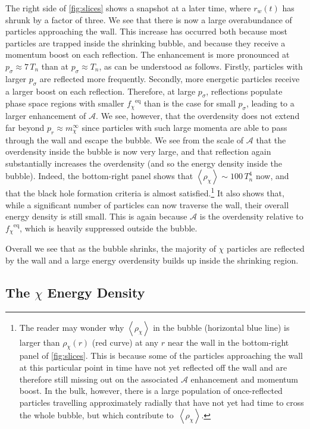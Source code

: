 \documentclass[
onecolumn, %
11pt, %
tightenlines,
superscriptaddress, %
nofootinbib, %
preprintnumbers, %
prd %
]{revtex4-1}
\newcommand{\ev}[1]{\ensuremath{\left\langle #1 %
        \right\rangle}} %
\newcommand{\f}{\ensuremath{f_\chi}\xspace}
\newcommand{\A}{\ensuremath{\mathcal A}\xspace}
\newcommand{\feq}{\ensuremath{\f^\text{eq}}\xspace}
\begin{document}
The right side of \cref{fig:slices} shows a snapshot at a later time, where $r_w(t)$ has shrunk by a factor of three.  We see that there is now a large overabundance of particles approaching the wall.  This increase has occurred both because most particles are trapped inside the shrinking bubble, and because they receive a momentum boost on each reflection. The enhancement is more pronounced at $p_\sigma \approx 7\,T_n$ than at $p_\sigma \approx T_n$, as can be understood as follows.  Firstly, particles with larger $p_\sigma$ are reflected more frequently. Secondly, more energetic particles receive a larger boost on each reflection.  Therefore, at large $p_\sigma$, reflections populate phase space regions with smaller \feq than is the case for small $p_\sigma$, leading to a larger enhancement of $\A$.  We see, however, that the overdensity does not extend far beyond $p_r \approx m_\chi^\infty$ since particles with such large momenta are able to pass through the wall and escape the bubble.  We see from the scale of $\A$ that the overdensity inside the bubble is now very large, and that reflection again substantially increases the overdensity (and so the energy density inside the bubble).  Indeed, the bottom-right panel shows that $\ev{\rho_\chi} \sim 100\,T_n^4$ now, and that the black hole formation criteria is almost satisfied.\footnote{The reader may wonder why $\ev{\rho_\chi}$ in the bubble (horizontal blue line) is larger than $\rho_\chi(r)$ (red curve) at any $r$ near the wall in the bottom-right panel of \cref{fig:slices}. This is because some of the particles approaching the wall at this particular point in time have not yet reflected off the wall and are therefore still missing out on the associated $\A$ enhancement and momentum boost.  In the bulk, however, there is a large population of once-reflected particles travelling approximately radially that have not yet had time to cross the whole bubble, but which contribute to~$\ev{\rho_\chi}$.}  It also shows that, while a significant number of particles can now traverse the wall, their overall energy density is still small.  This is again because $\mathcal{A}$ is the overdensity relative to $\f^\text{eq}$, which is heavily suppressed outside the bubble. 

Overall we see that as the bubble shrinks, the majority of $\chi$ particles are reflected by the wall and a large energy overdensity builds up inside the shrinking region.


\subsection{The $\chi$ Energy Density}
\label{sec:energy-density}
\end{document}
